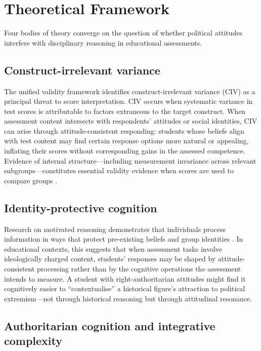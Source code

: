 \documentclass[pdflatex,sn-apa]{sn-jnl}%
\begin{document}
\section{Theoretical Framework}\label{sec:theory}

Four bodies of theory converge on the question of whether political attitudes interfere with disciplinary reasoning in educational assessments.

\subsection{Construct-irrelevant variance}\label{subsec:civ}

The unified validity framework \citep{Messick1995, AERA2014} identifies construct-irrelevant variance (CIV) as a principal threat to score interpretation. CIV occurs when systematic variance in test scores is attributable to factors extraneous to the target construct. When assessment content intersects with respondents' attitudes or social identities, CIV can arise through attitude-consistent responding: students whose beliefs align with test content may find certain response options more natural or appealing, inflating their scores without corresponding gains in the assessed competence. Evidence of internal structure---including measurement invariance across relevant subgroups---constitutes essential validity evidence when scores are used to compare groups \citep{AERA2014}.

\subsection{Identity-protective cognition}\label{subsec:ipc}

Research on motivated reasoning demonstrates that individuals process information in ways that protect pre-existing beliefs and group identities \citep{Kahan2017, Jost2003}. In educational contexts, this suggests that when assessment tasks involve ideologically charged content, students' responses may be shaped by attitude-consistent processing rather than by the cognitive operations the assessment intends to measure. A student with right-authoritarian attitudes might find it cognitively easier to ``contextualise'' a historical figure's attraction to political extremism---not through historical reasoning but through attitudinal resonance.

\subsection{Authoritarian cognition and integrative complexity}\label{subsec:auth}
\end{document}
